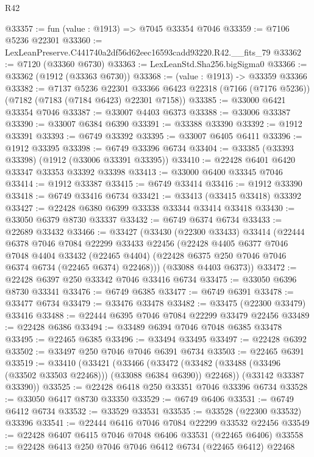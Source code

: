\begin{lexlean}{R42}
\begin{coremodule}
{@33357 := fun (value : @1913) => @7045 @33354 @7046
@33359 := @7106 @5236 @22301
@33360 := LexLeanPreserve.C441740a2df56d62eec16593cadd93220.R42.__fits_79
@33362 := @7120 (@33360 @6730)
@33363 := LexLeanStd.Sha256.bigSigma0
@33366 := @33362 (@1912 (@33363 @6730))
@33368 := (value : @1913) -> @33359 @33366
@33382 := @7137
    @5236
    @22301
    @33366
    @6423
    @22318
    (@7166 (@7176 @5236))
    (@7182 (@7183 (@7184 @6423) @22301 @7158))
@33385 := @33000 @6421 @33354 @7046
@33387 := @33007 @4403 @6373
@33388 := @33006 @33387
@33390 := @33007 @6384 @6390
@33391 := @33388 @33390
@33392 := @1912 @33391
@33393 := @6749 @33392
@33395 := @33007 @6405 @6411
@33396 := @1912 @33395
@33398 := @6749 @33396 @6734
@33404 := @33385 (@33393 @33398) (@1912 (@33006 @33391 @33395))
@33410 := @22428 @6401 @6420 @33347 @33353 @33392 @33398
@33413 := @33000 @6400 @33345 @7046
@33414 := @1912 @33387
@33415 := @6749 @33414
@33416 := @1912 @33390
@33418 := @6749 @33416 @6734
@33421 := @33413 (@33415 @33418) @33392
@33427 := @22428 @6380 @6399 @33338 @33344 @33414 @33418
@33430 := @33050 @6379 @8730 @33337
@33432 := @6749 @6374 @6734
@33433 := @22689 @33432
@33466 := @33427
    (@33430
      (@22300 @33433)
      @33414
      (@22444
        @6378
        @7046
        @7084
        @22299
        @33433
        @22456
        (@22428
          @4405
          @6377
          @7046
          @7048
          @4404
          @33432
          (@22465 @4404)
          (@22428 @6375 @250 @7046 @7046 @6374 @6734 (@22465 @6374) @22468)))
      (@33088 @4403 @6373))
@33472 := @22428 @6397 @250 @33342 @7046 @33416 @6734
@33475 := @33050 @6396 @8730 @33341
@33476 := @6749 @6385
@33477 := @6749 @6391
@33478 := @33477 @6734
@33479 := @33476 @33478
@33482 := @33475 (@22300 @33479) @33416
@33488 := @22444 @6395 @7046 @7084 @22299 @33479 @22456
@33489 := @22428 @6386
@33494 := @33489 @6394 @7046 @7048 @6385 @33478
@33495 := @22465 @6385
@33496 := @33494 @33495
@33497 := @22428 @6392
@33502 := @33497 @250 @7046 @7046 @6391 @6734
@33503 := @22465 @6391
@33519 := @33410
    (@33421
      (@33466
        (@33472 (@33482 (@33488 (@33496 (@33502 @33503 @22468))) (@33088 @6384 @6390)) @22468))
      (@33142 @33387 @33390))
@33525 := @22428 @6418 @250 @33351 @7046 @33396 @6734
@33528 := @33050 @6417 @8730 @33350
@33529 := @6749 @6406
@33531 := @6749 @6412 @6734
@33532 := @33529 @33531
@33535 := @33528 (@22300 @33532) @33396
@33541 := @22444 @6416 @7046 @7084 @22299 @33532 @22456
@33549 := @22428 @6407 @6415 @7046 @7048 @6406 @33531 (@22465 @6406)
@33558 := @22428 @6413 @250 @7046 @7046 @6412 @6734 (@22465 @6412) @22468
}
\end{coremodule}
\end{lexlean}
